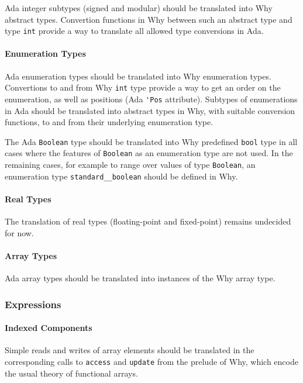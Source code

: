 \documentclass[fullpage]{article}
\newcounter{example}
\begin{document}
Ada integer subtypes (signed and modular) should be translated into Why
abstract types. Convertion functions in Why between such an abstract type and
type \verb|int| provide a way to translate all allowed type conversions in Ada.
 
\paragraph{Enumeration Types}

Ada enumeration types should be translated into Why enumeration
types. Convertions to and from Why \verb|int| type provide a way to get an
order on the enumeration, as well as positions (Ada \verb|'Pos|
attribute). Subtypes of enumerations in Ada should be translated into abstract
types in Why, with suitable conversion functions, to and from their underlying
enumeration type.

The Ada \verb|Boolean| type should be translated into Why predefined
\verb|bool| type in all cases where the features of \verb|Boolean| as an
enumeration type are not used. In the remaining cases, for example to range
over values of type \verb|Boolean|, an enumeration type
\verb|standard__boolean| should be defined in Why.

\paragraph{Real Types}

The translation of real types (floating-point and fixed-point) remains
undecided for now.

\paragraph{Array Types}

Ada array types should be translated into instances of the Why array type. 

\subsubsection{Expressions}

\paragraph{Indexed Components} 

Simple reads and writes of array elements should be translated in the
corresponding calls to \verb|access| and \verb|update| from the prelude of Why,
which encode the usual theory of functional arrays.
\end{document}

